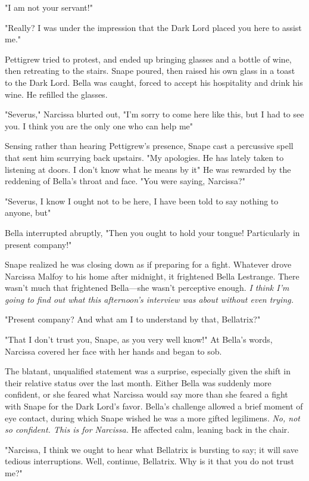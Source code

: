 "I am not your servant!"

"Really? I was under the impression that the Dark Lord placed you here to assist me."

Pettigrew tried to protest, and ended up bringing glasses and a bottle of wine, then retreating to the stairs. Snape poured, then raised his own glass in a toast to the Dark Lord. Bella was caught, forced to accept his hospitality and drink his wine. He refilled the glasses.

"Severus," Narcissa blurted out, "I'm sorry to come here like this, but I had to see you. I think you are the only one who can help me{\el}"

Sensing rather than hearing Pettigrew's presence, Snape cast a percussive spell that sent him scurrying back upstairs. "My apologies. He has lately taken to listening at doors. I don't know what he means by it{\el}" He was rewarded by the reddening of Bella's throat and face. "You were saying, Narcissa?"

"Severus, I know I ought not to be here, I have been told to say nothing to anyone, but{\el}"

Bella interrupted abruptly, "Then you ought to hold your tongue! Particularly in present company!"

Snape realized he was closing down as if preparing for a fight. Whatever drove Narcissa Malfoy to his home after midnight, it frightened Bella Lestrange. There wasn't much that frightened Bella—she wasn't perceptive enough. \emph{I think I'm going to find out what this afternoon's interview was about without even trying.}

"Present company? And what am I to understand by that, Bellatrix?"

"That I don't trust you, Snape, as you very well know!" At Bella's words, Narcissa covered her face with her hands and began to sob.

The blatant, unqualified statement was a surprise, especially given the shift in their relative status over the last month. Either Bella was suddenly more confident, or she feared what Narcissa would say more than she feared a fight with Snape for the Dark Lord's favor. Bella's challenge allowed a brief moment of eye contact, during which Snape wished he was a more gifted legilimens. \emph{No, not so confident. This is for Narcissa.} He affected calm, leaning back in the chair.

"Narcissa, I think we ought to hear what Bellatrix is bursting to say; it will save tedious interruptions. Well, continue, Bellatrix. Why is it that you do not trust me?"

